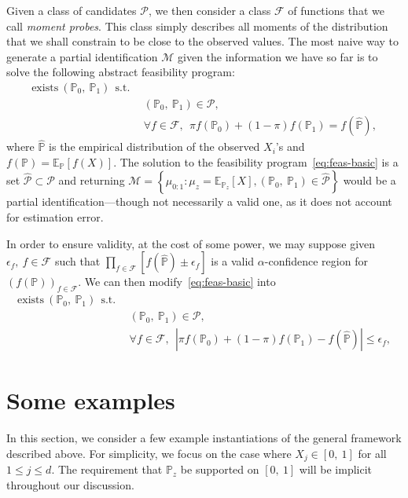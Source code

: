 \documentclass[11pt,twoside]{article}
\newcommand{\E}{\mathbb{E}}
\renewcommand{\P}{\mathbb{P}}
\newcommand{\mupart}{\mathcal{M}}
\newcommand{\dists}{\mathcal{P}}
\newcommand{\funcs}{\mathcal{F}}
\newcommand{\texists}{\mathrm{exists}}
\begin{document}
Given a class of candidates $\dists$, we then consider a class $\funcs$ of functions that we call \emph{moment probes}. This class simply describes all
moments of the distribution that we shall constrain to be close to the observed values. The most naive way to generate a partial identification $\mupart$ 
given the information we have so far is to solve the following abstract feasibility program:
\begin{align}
\texists~\left(\P_{0},~\P_{1}\right) ~~ \text{s.t.} & ~~ \label{eq:feas-basic} \\
 & ~~ \left(\P_{0},~\P_{1}\right) \in \dists, \nonumber \\
 & ~~ \forall f \in \funcs,~~ \pi f\left(\P_{0}\right) + (1 - \pi) f \left(\P_{1}\right) = f\left(\hat{\P}\right) , \nonumber
\end{align}
where $\hat{\P}$ is the empirical distribution of the observed $X_{i}$'s and $f\left(\P\right) = \E_{\P}\left[f\left(X\right)\right]$. The solution to the feasibility program~\eqref{eq:feas-basic} is a set $\hat{\dists} \subset \dists$ and returning $\mupart = \left\lbrace \mu_{0:1} \colon \mu_{z} = \E_{\P_{z}}\left[X\right], \left(\P_{0},~\P_{1}\right) \in \hat{\dists}\right\rbrace$ would be a partial identification---though not necessarily a valid one, as it does not account for estimation error. 

In order to ensure validity, at the cost of some power, we may suppose given $\epsilon_{f},~f\in\funcs$ such that $\prod_{f \in \funcs} \left[f\left(\hat{\P}\right) \pm \epsilon_{f}\right]$ is a valid $\alpha$-confidence region for $\left(f\left(\P\right)\right)_{f \in \funcs}$. We can then
modify~\eqref{eq:feas-basic} into
\begin{align}
\texists~\left(\P_{0},~\P_{1}\right) ~~ \text{s.t.} & ~~ \label{eq:feas-eps} \\
 & ~~ \left(\P_{0},~\P_{1}\right) \in \dists, \nonumber \\
 & ~~ \forall f \in \funcs,~~ \left|\pi f\left(\P_{0}\right) + (1 - \pi) f \left(\P_{1}\right) - f\left(\hat{\P}\right)\right| \leq \epsilon_{f} , \nonumber
\end{align}

\section{Some examples}

In this section, we consider a few example instantiations of the general framework described above. For simplicity, we focus on the case where 
$X_{j} \in \left[0,~1\right]$ for all $1 \leq j \leq d$. The requirement that $\P_{z}$ be supported on $[0,~1]$ will be implicit throughout our discussion.
\end{document}
